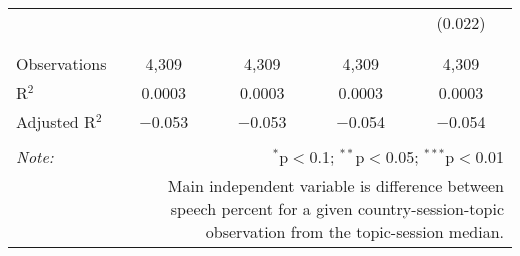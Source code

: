 \begin{table}[!htbp]
\begin{tabular}{@{\extracolsep{5pt}}lcccc}
  &  &  &  & (0.022) \\ 
  & & & & \\ 
\hline \\[-1.8ex] 
Observations & 4,309 & 4,309 & 4,309 & 4,309 \\ 
R$^{2}$ & 0.0003 & 0.0003 & 0.0003 & 0.0003 \\ 
Adjusted R$^{2}$ & $-$0.053 & $-$0.053 & $-$0.054 & $-$0.054 \\ 
\hline 
\hline \\[-1.8ex] 
\textit{Note:}  & \multicolumn{4}{r}{$^{*}$p$<$0.1; $^{**}$p$<$0.05; $^{***}$p$<$0.01} \\ 
 & \multicolumn{4}{r}{Main independent variable is difference between speech percent for a given country-session-topic observation from the topic-session median.} \\ 
\end{tabular} 
\end{table} 
